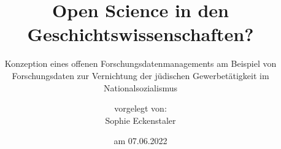 \titlehead{Humboldt-Universität zu Berlin\\
Philosophische Fakultät\\
Institut für Geschichtswissenschaften\vspace*{4cm}}
\subject{Masterarbeit}
\title{Open Science in den Geschichtswissenschaften?}
\subtitle{Konzeption eines offenen Forschungsdatenmanagements am Beispiel von Forschungsdaten zur Vernichtung der jüdischen Gewerbetätigkeit im Nationalsozialismus}
\author{vorgelegt von:\\Sophie Eckenstaler}
\date{am 07.06.2022\vspace*{4cm}}
\publishers{\normalsize
    Erstbetreuer: Prof. Dr. Rüdiger Hohls, Institut für Geschichtswissenschaften, HU Berlin\\
    Zweitbetreuer: Prof. Dr. Michael Wildt, Institut für Geschichtswissenschaften, HU Berlin\vspace{0.5cm}
    Studiengang: Master of Arts, Geschichtswissenschaften, Schwerpunkt: Digital History\\
    Matrikelnummer: 596272\\
    eMail: eckensts@hu-berlin.de}


